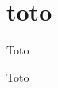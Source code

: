 \documentclass{article}
\begin{document}
\part{toto}
\begin{pages}
  \begin{Leftside}
    \beginnumbering
     \pstart
     Toto
     \pend
    \endnumbering
  \end{Leftside}

  \begin{Rightside}
    \beginnumbering
     \pstart
     Toto
     \pend
    \endnumbering
  \end{Rightside}
\end{pages}
\Pages[mainmatter]
\end{document}
